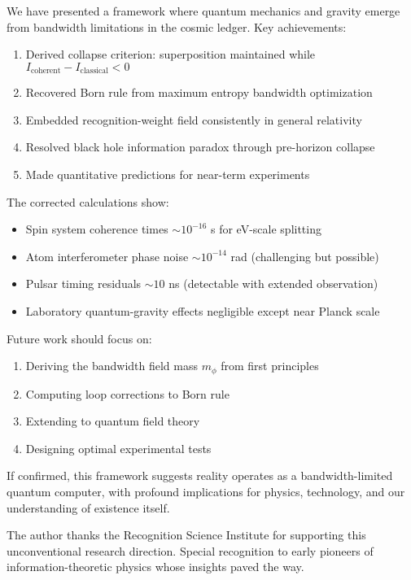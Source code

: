 \documentclass[twocolumn,prd,amsmath,amssymb,aps,superscriptaddress,nofootinbib]{revtex4-2}
\begin{document}
We have presented a framework where quantum mechanics and gravity emerge from bandwidth limitations in the cosmic ledger. Key achievements:

\begin{enumerate}
\item Derived collapse criterion: superposition maintained while $I_{\text{coherent}} - I_{\text{classical}} < 0$
\item Recovered Born rule from maximum entropy bandwidth optimization
\item Embedded recognition-weight field consistently in general relativity
\item Resolved black hole information paradox through pre-horizon collapse
\item Made quantitative predictions for near-term experiments
\end{enumerate}

The corrected calculations show:
\begin{itemize}
\item Spin system coherence times $\sim 10^{-16}$ s for eV-scale splitting
\item Atom interferometer phase noise $\sim 10^{-14}$ rad (challenging but possible)
\item Pulsar timing residuals $\sim 10$ ns (detectable with extended observation)
\item Laboratory quantum-gravity effects negligible except near Planck scale
\end{itemize}

Future work should focus on:
\begin{enumerate}
\item Deriving the bandwidth field mass $m_\phi$ from first principles
\item Computing loop corrections to Born rule
\item Extending to quantum field theory
\item Designing optimal experimental tests
\end{enumerate}

If confirmed, this framework suggests reality operates as a bandwidth-limited quantum computer, with profound implications for physics, technology, and our understanding of existence itself.

\acknowledgments

The author thanks the Recognition Science Institute for supporting this unconventional research direction. Special recognition to early pioneers of information-theoretic physics whose insights paved the way.
\end{document}
